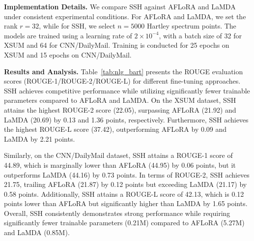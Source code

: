 \begin{table}[!t]
    \centering
    \caption{Performance comparison of SSH, AFLoRA, and LaMDA on BART-Large for text summarization tasks. Results are reported as ROUGE-1/ROUGE-2/ROUGE-L.}
    \label{tab:nlg_bart}
\end{table}

\noindent \textbf{Implementation Details.}  
We compare SSH against AFLoRA and LaMDA under consistent experimental conditions. For AFLoRA and LaMDA, we set the rank $r=32$, while for SSH, we select $n=5000$ Hartley spectrum points. The models are trained using a learning rate of $2\times10^{-4}$, with a batch size of 32 for XSUM and 64 for CNN/DailyMail. Training is conducted for 25 epochs on XSUM and 15 epochs on CNN/DailyMail.

\noindent \textbf{Results and Analysis.}  
Table~\ref{tab:nlg_bart} presents the ROUGE evaluation scores (ROUGE-1/ROUGE-2/ROUGE-L) for different fine-tuning approaches. SSH achieves competitive performance while utilizing significantly fewer trainable parameters compared to AFLoRA and LaMDA. On the XSUM dataset, SSH attains the highest ROUGE-2 score (22.05), surpassing AFLoRA (21.92) and LaMDA (20.69) by 0.13 and 1.36 points, respectively. Furthermore, SSH achieves the highest ROUGE-L score (37.42), outperforming AFLoRA by 0.09 and LaMDA by 2.21 points.

Similarly, on the CNN/DailyMail dataset, SSH attains a ROUGE-1 score of 44.89, which is marginally lower than AFLoRA (44.95) by 0.06 points, but it outperforms LaMDA (44.16) by 0.73 points. In terms of ROUGE-2, SSH achieves 21.75, trailing AFLoRA (21.87) by 0.12 points but exceeding LaMDA (21.17) by 0.58 points. Additionally, SSH attains a ROUGE-L score of 42.13, which is 0.12 points lower than AFLoRA but significantly higher than LaMDA by 1.65 points. Overall, SSH consistently demonstrates strong performance while requiring significantly fewer trainable parameters (0.21M) compared to AFLoRA (5.27M) and LaMDA (0.85M). 

